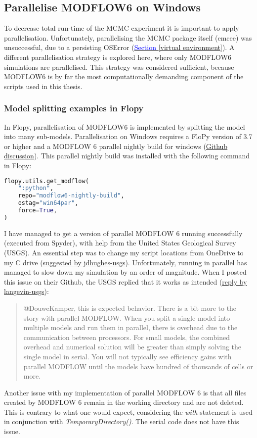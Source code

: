 \subsection{Parallelise MODFLOW6 on Windows}\label{winpar}
To decrease total run-time of the MCMC experiment it is important to apply parallelisation. Unfortunately, parallelising the MCMC package itself (emcee) was unsuccessful, due to a persisting OSError (\hyperref[virtual environment]{\textcolor{blue}{Section }\ref{virtual environment}}). A different parallelisation strategy is explored here, where only MODFLOW6 simulations are parallelised. This strategy was considered sufficient, because MODFLOW6 is by far the most computationally demanding component of the scripts used in this thesis. 

\subsubsection{Model splitting examples in Flopy}
In Flopy, parallelisation of MODFLOW6 is implemented by splitting the model into many sub-models. Parallelisation on Windows requires a FloPy version of 3.7 or higher and a MODFLOW 6 parallel nightly build for windows (\href{https://github.com/modflowpy/flopy/discussions/2316}{Github discussion}). This parallel nightly build was installed with the following command in Flopy: 
\begin{lstlisting}[language=Python]
flopy.utils.get_modflow(
    ":python", 
    repo="modflow6-nightly-build", 
    ostag="win64par", 
    force=True,
)
\end{lstlisting}

I have managed to get a version of parallel MODFLOW 6 running successfully (executed from Spyder), with help from the United States Geological Survey (USGS). An essential step was to change my script locations from OneDrive to my C drive (\href{https://github.com/modflowpy/flopy/discussions/2316}{suggested by jdhughes-usgs}). Unfortunately, running in parallel has managed to slow down my simulation by an order of magnitude. When I posted this issue on their Github, the USGS replied that it works as intended (\href{https://github.com/modflowpy/flopy/discussions/2319}{reply by langevin-usgs}):
\begin{quote}
    @DouweKamper, this is expected behavior. There is a bit more to the story with parallel MODFLOW. When you split a single model into multiple models and run them in parallel, there is overhead due to the communication between processors. For small models, the combined overhead and numerical solution will be greater than simply solving the single model in serial. You will not typically see efficiency gains with parallel MODFLOW until the models have hundred of thousands of cells or more.
\end{quote}

Another issue with my implementation of parallel MODFLOW 6 is that all files created by MODFLOW 6 remain in the working directory and are not deleted. This is contrary to what one would expect, considering the \textit{with} statement is used in conjunction with \textit{TemporaryDirectory()}. The serial code does not have this issue. 